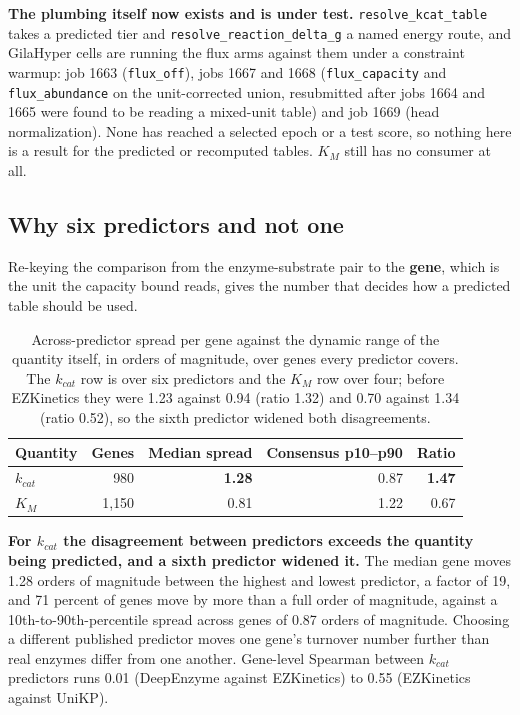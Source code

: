 \textbf{The plumbing itself now exists and is under test.} \texttt{resolve\_kcat\_table}
takes a predicted tier and \texttt{resolve\_reaction\_delta\_g} a named energy route, and
GilaHyper cells are running the flux arms against them under a constraint warmup: job 1663
(\texttt{flux\_off}), jobs 1667 and 1668 (\texttt{flux\_capacity} and
\texttt{flux\_abundance} on the unit-corrected union, resubmitted after jobs 1664 and 1665
were found to be reading a mixed-unit table) and job 1669 (head normalization). None has
reached a selected epoch or a test score, so nothing here is a result for the predicted or
recomputed tables. $K_M$ still has no consumer at all.

\subsection{Why six predictors and not one}

Re-keying the comparison from the enzyme-substrate pair to the \textbf{gene}, which is the
unit the capacity bound reads, gives the number that decides how a predicted table should
be used.

\begin{table}[H]
  \centering
  \footnotesize
  \caption[Per-gene disagreement]{Across-predictor spread per gene against the dynamic
  range of the quantity itself, in orders of magnitude, over genes every predictor covers. The
  $k_{cat}$ row is over six predictors and the $K_M$ row over four; before EZKinetics they
  were 1.23 against 0.94 (ratio 1.32) and 0.70 against 1.34 (ratio 0.52), so the sixth
  predictor widened both disagreements.}
  \label{tab:pergene}
  \begin{tabular}{@{}lrrrr@{}}
    \hline
    Quantity & Genes & Median spread & Consensus p10--p90 & Ratio \\
    \hline
    $k_{cat}$ & 980 & \textbf{1.28} & 0.87 & \textbf{1.47} \\
    $K_M$ & 1{,}150 & 0.81 & 1.22 & 0.67 \\
    \hline
  \end{tabular}
\end{table}

\textbf{For $k_{cat}$ the disagreement between predictors exceeds the quantity being
predicted, and a sixth predictor widened it.} The median gene moves 1.28 orders of magnitude between the
highest and lowest predictor, a factor of 19, and 71 percent of genes move by more than a
full order of magnitude, against a 10th-to-90th-percentile spread across genes of 0.87
orders of magnitude.
Choosing a different published predictor moves one gene's turnover number further than
real enzymes differ from one another. Gene-level Spearman between $k_{cat}$ predictors runs
0.01 (DeepEnzyme against EZKinetics) to 0.55 (EZKinetics against UniKP).

